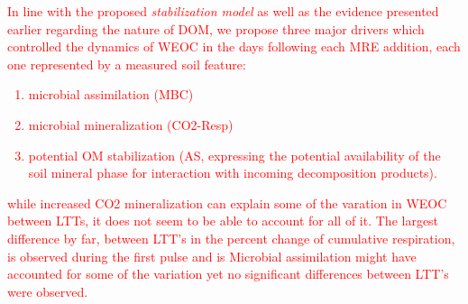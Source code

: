 \documentclass[12pt]{report}
\newcommand{\myRed}[1]{\textcolor{red}{#1}} %
\begin{document}
\myRed{
In line with the proposed \textit{stabilization model} as well as the evidence presented earlier regarding the nature of DOM, we propose three  major drivers which controlled the dynamics of WEOC in the days following each MRE addition, each one represented by a measured soil feature:
\begin{enumerate}
	\item microbial assimilation (MBC)
	\item microbial mineralization (CO2-Resp) 
	\item potential  OM stabilization (AS, expressing the potential availability of the soil mineral phase for interaction with incoming decomposition products).
\end{enumerate}
while increased CO2 mineralization can explain some of the varation in WEOC between LTTs, it does not seem to be able to account for all of it. The largest difference by far, between LTT's in the percent change of cumulative respiration, is observed during the first pulse and is   Microbial assimilation might have accounted for some of the variation yet no significant differences between LTT's were observed.} 

















\end{document}

